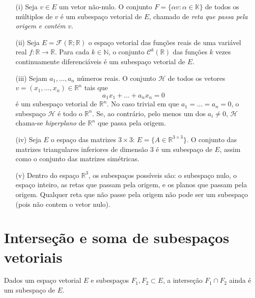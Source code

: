 \begin{exemplo}
  \begin{itemize}
  \item[(i)] Seja $v\in E$ um vetor não-nulo. O conjunto $F = \{\alpha v: \alpha \in {\mathbb{K}}\}$ de todos os múltiplos de $v$ é um subespaço vetorial de $E$, chamado de \emph{reta que passa pela origem e contém $v$}.
  \item[(ii)] Seja $E={\mathcal{F}}({\mathbb{R}};{\mathbb{R}})$ o espaço vetorial das funções reais de uma variável real $f:{\mathbb{R}} \rightarrow {\mathbb{R}}$. Para cada $k\in {\mathbb{N}}$, o conjunto ${\mathcal{C}}^k ({\mathbb{R}})$ das funções $k$ vezes continuamente diferenciáveis é um subespaço vetorial de $E$. 
  \item[(iii)] Sejam $a_1,\ldots,a_n$ números reais. O conjunto ${\mathcal{H}}$ de todos os vetores $v=(x_1,\ldots,x_n) \in {\mathbb{R}}^n$ tais que
    \begin{equation*}
      a_1x_1+\ldots+a_nx_n=0
    \end{equation*}
    é um subespaço vetorial de ${\mathbb{R}}^n$. No caso trivial em que $a_1=\ldots=a_n=0$, o subespaço ${\mathcal{H}}$ é todo o ${\mathbb{R}}^n$. Se, ao contrário, pelo menos um dos $a_i\ne 0$, ${\mathcal{H}}$ chama-se \emph{hiperplano} de ${\mathbb{R}}^n$ que passa pela origem.
  \item[(iv)] Seja $E$ o espaço das matrizes $3\times 3$: $E = \{ A \in {\mathbb{R}}^{3\times 3}\}$. O conjunto das matrizes triangulares inferiores de dimensão 3 é um subespaço de $E$, assim como o conjunto das matrizes simétricas.
  \item[(v)] Dentro do espaço ${\mathbb{R}}^3$, os subespaços possíveis são: o subespaço nulo, o espaço inteiro, as retas que passam pela origem, e os planos que passam pela origem. Qualquer reta que não passe pela origem não pode ser um subespaço (pois não contem o vetor nulo).
  \end{itemize}
\end{exemplo}

\section{Interseção e soma de subespaços vetoriais}

\begin{teo}
  Dados um espaço vetorial $E$ e subespaços $F_1,F_2 \subset E$, a interseção $F_1 \cap F_2$ ainda é um subespaço de $E$.
\end{teo}

